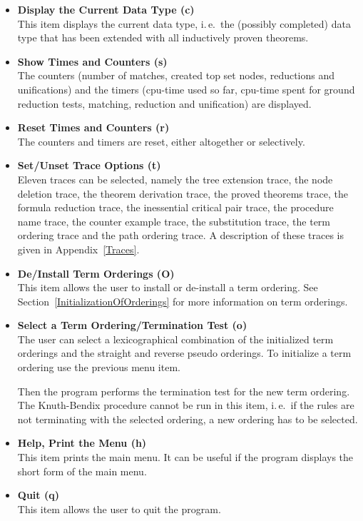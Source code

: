 \begin{itemize}
\item {\bf Display the Current Data Type (c)}\\
This item displays the current data type, i.\,e.\  the (possibly
completed) data type that has been extended with all 
inductively proven theorems.

\item {\bf Show Times and Counters (s)}\\
The counters (number of matches, created top set nodes, reductions
and unifications) and
the timers (cpu-time used so far, cpu-time spent for ground reduction
tests, matching, reduction and unification) are displayed.

\item {\bf Reset Times and Counters (r)}\\
The counters and timers are reset, either altogether or selectively.

\item {\bf Set/Unset Trace Options (t)}\\
Eleven traces can be selected, namely the tree extension trace, the
node deletion trace, the
theorem derivation trace, the proved theorems trace, the formula reduction 
trace, the inessential critical pair trace, the procedure name trace, 
the counter example trace, the substitution trace, the term ordering
trace and the path ordering trace.
A description of these traces is given in Appendix~\ref{Traces}.

\item {\bf De/Install Term Orderings (O)}\\
This item allows the user to install or de-install a term ordering. See
Section~\ref{InitializationOfOrderings} for more information
on term orderings.

\item {\bf Select a Term Ordering/Termination Test (o)}\\
The user can select a lexicographical combination of the initialized 
term orderings and the straight and reverse pseudo orderings.
To initialize a term ordering use the previous menu item.

Then the program performs the termination test for the new 
term ordering. The Knuth-Bendix procedure cannot be run in this
item, i.\,e.\  if the rules are not terminating with the selected
ordering, a new ordering has to be selected.

\item {\bf Help, Print the Menu (h)}\\
This item prints the main menu. It can be useful if the program
displays the short form  of the main menu.

\item {\bf Quit (q)}\\
This item allows the user to quit the program.
\end{itemize}

